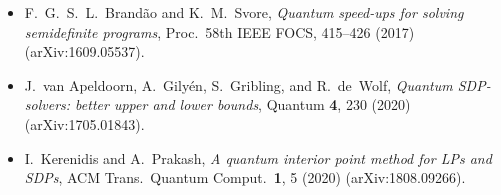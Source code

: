 \readingsection
\begin{itemize}[leftmargin=1.4em]
  \item F.~G.~S.~L.~Brand\~ao and K.~M.~Svore, \emph{Quantum speed-ups for solving semidefinite
        programs}, Proc.\ 58th IEEE FOCS, 415--426 (2017) (arXiv:1609.05537).
  \item J.~van Apeldoorn, A.~Gily\'en, S.~Gribling, and R.~de~Wolf, \emph{Quantum SDP-solvers:
        better upper and lower bounds}, Quantum \textbf{4}, 230 (2020) (arXiv:1705.01843).
  \item I.~Kerenidis and A.~Prakash, \emph{A quantum interior point method for LPs and SDPs},
        ACM Trans.\ Quantum Comput.\ \textbf{1}, 5 (2020) (arXiv:1808.09266).
\end{itemize}
